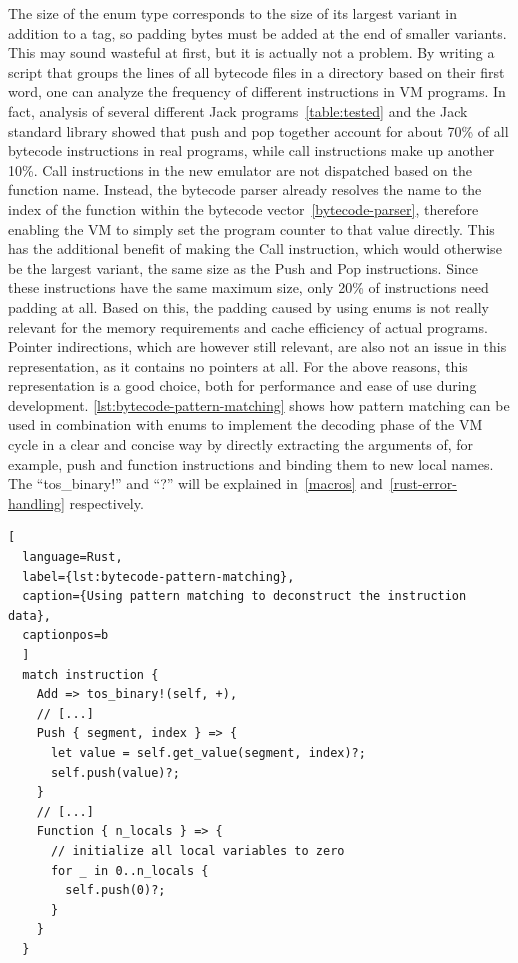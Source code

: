 \label{call-instruction}
The size of the enum type corresponds to the size of its largest variant in addition to a tag, so padding bytes must be added at the end of smaller variants. This may sound wasteful at first, but it is actually not a problem.
By writing a script that groups the lines of all bytecode files in a directory based on their first word, one can analyze the frequency of different instructions in VM programs.
In fact, analysis of several different Jack programs~\ref{table:tested} and the Jack standard library showed that push and pop together account for about 70\% of all bytecode instructions in real programs, while call instructions make up another 10\%.
Call instructions in the new emulator are not dispatched based on the function name. Instead, the bytecode parser already resolves the name to the index of the function within the bytecode vector~\ref{bytecode-parser}, therefore enabling the VM to simply set the program counter to that value directly.
This has the additional benefit of making the Call instruction, which would otherwise be the largest variant, the same size as the Push and Pop instructions.
Since these instructions have the same maximum size, only 20\% of instructions need padding at all.
Based on this, the padding caused by using enums is not really relevant for the memory requirements and cache efficiency of actual programs.
Pointer indirections, which are however still relevant, are also not an issue in this representation, as it contains no pointers at all.
For the above reasons, this representation is a good choice, both for performance and ease of use during development.
\cref{lst:bytecode-pattern-matching} shows how pattern matching can be used in combination with enums to implement the decoding phase of the VM cycle in a clear and concise way by directly extracting the arguments of, for example, push and function instructions and binding them to new local names.
The ``tos\_binary!'' and ``?'' will be explained in~\cref{macros} and~\cref{rust-error-handling} respectively.

\begin{lstlisting}[
  language=Rust,
  label={lst:bytecode-pattern-matching},
  caption={Using pattern matching to deconstruct the instruction data},
  captionpos=b
  ]
  match instruction {
    Add => tos_binary!(self, +),
    // [...]
    Push { segment, index } => {
      let value = self.get_value(segment, index)?;
      self.push(value)?;
    }
    // [...]
    Function { n_locals } => {
      // initialize all local variables to zero
      for _ in 0..n_locals {
        self.push(0)?;
      }
    }
  }
\end{lstlisting}

